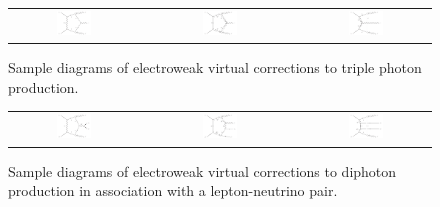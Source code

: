 \begin{figure}[t!]
  \begin{tabular}{ccccc}
    \includegraphics[width=0.288\textwidth]{diagrams/aaa_V_2} & &
    \includegraphics[width=0.288\textwidth]{diagrams/aaa_V_1} & &
    \includegraphics[width=0.288\textwidth]{diagrams/aaa_V_3} \\
  \end{tabular}
  \caption{
    Sample diagrams of electroweak virtual corrections to triple 
    photon production.
  }
\end{figure}

\begin{figure}[t!]
  \begin{tabular}{ccccc}
    \includegraphics[width=0.288\textwidth]{diagrams/aaW_V_2} & &
    \includegraphics[width=0.288\textwidth]{diagrams/aaW_V_1} & &
    \includegraphics[width=0.288\textwidth]{diagrams/aaW_V_3} \\
  \end{tabular}
  \caption{
    Sample diagrams of electroweak virtual corrections to diphoton 
    production in association with a lepton-neutrino pair.
  }
\end{figure}

